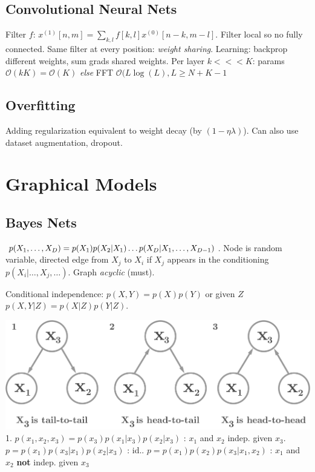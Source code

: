 \subsection{Convolutional Neural Nets}
Filter $f$: $x^{(1)}[n,m] = \sum_{k,l} f[k,l]x^{(0)}[n-k, m-l]$. Filter local so no fully connected. Same filter at every position: \textit{weight sharing}. Learning: backprop different weights, sum grads shared weights.  Per layer $k<<<K$: params $\mathcal{O}(kK)=\mathcal{O}(K)$ \textit{else} FFT $\mathcal{O}(L\log(L), L\geq N+K-1$

\subsection{Overfitting}
Adding regularization equivalent to weight decay (by $(1-\eta\lambda)$). Can also use dataset augmentation, dropout.


\section{Graphical Models}
\subsection{Bayes Nets}
$p(X_1,\dots,X_D) = p(X_1)p(X_2|X_1)\dots\newline p(X_D|X_1,\dots,X_{D-1})$. Node is random variable, directed edge from $X_j$ to $X_i$ if $X_j$ appears in the conditioning $p(X_i|\dots,X_j,\dots)$. Graph \textit{acyclic} (must).

Conditional independence: $p(X,Y)=p(X)p(Y)$ or given $Z$ $p(X,Y|Z)=p(X|Z)p(Y|Z)$.

\includegraphics[width=\linewidth]{figs/bayes.png}
1. $p(x_1, x_2, x_3) = p(x_3)p(x_1|x_3)p(x_2|x_3)$ : $x_1$ and $x_2$  indep. given $x_3$. $p = p(x_1)p(x_3|x_1)p(x_2|x_3)$ : id.. $p = p(x_1)p(x_2)p(x_3|x_1, x_2)$ : $x_1$ and $x_2$  \textbf{not} indep. given $x_3$

